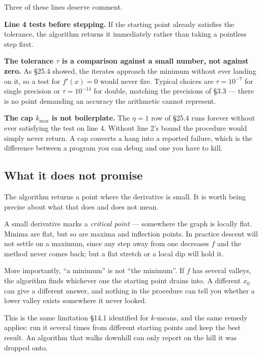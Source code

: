 \documentclass[11pt]{article}
\theoremstyle{plain}
\theoremstyle{definition}
\theoremstyle{remark}
\newcommand{\lr}{\eta}
\begin{document}
\noindent Three of these lines deserve comment.

\textbf{Line 4 tests before stepping.} If the starting point already satisfies
the tolerance, the algorithm returns it immediately rather than taking a
pointless step first.

\textbf{The tolerance $\tau$ is a comparison against a small number, not against
zero.} As \S25.4 showed, the iterates approach the minimum without ever landing
on it, so a test for $f'(x)=0$ would never fire. Typical choices are
$\tau=10^{-7}$ for single precision or $\tau=10^{-14}$ for double, matching the
precisions of \S3.3 --- there is no point demanding an accuracy the arithmetic
cannot represent.

\textbf{The cap $k_{\max}$ is not boilerplate.} The $\lr=1$ row of \S25.4 runs
forever without ever satisfying the test on line 4. Without line 2's bound the
procedure would simply never return. A cap converts a hang into a reported
failure, which is the difference between a program you can debug and one you
have to kill.

\subsection{What it does not promise}
The algorithm returns a point where the derivative is small. It is worth being
precise about what that does and does not mean.

A small derivative marks a \emph{critical point} --- somewhere the graph is
locally flat. Minima are flat, but so are maxima and inflection points. In
practice descent will not settle on a maximum, since any step away from one
decreases $f$ and the method never comes back; but a flat stretch or a local dip
will hold it.

More importantly, ``a minimum'' is not ``the minimum''. If $f$ has several
valleys, the algorithm finds whichever one the starting point drains into. A
different $x_0$ can give a different answer, and nothing in the procedure can
tell you whether a lower valley exists somewhere it never looked.

This is the same limitation \S14.1 identified for $k$-means, and the same remedy
applies: run it several times from different starting points and keep the best
result. An algorithm that walks downhill can only report on the hill it was
dropped onto.
\end{document}
